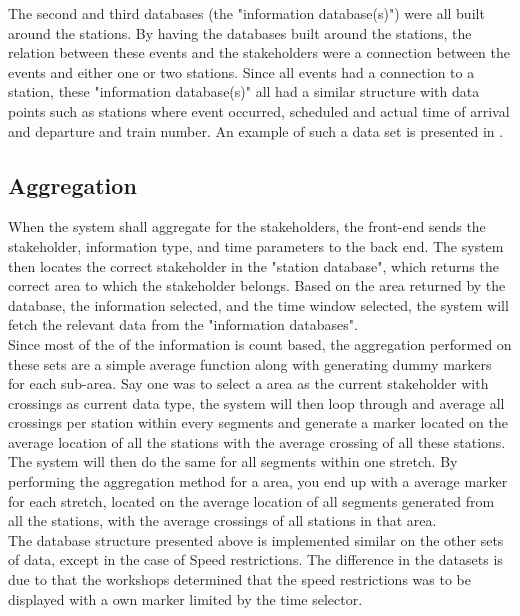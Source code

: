 The second and third databases (the "information database(s)") were all built
around the stations. By having the databases built around the stations, the 
relation between these events and the stakeholders were a connection between 
the events and either one or two stations. Since all events had a connection 
to a station, these "information database(s)" all had a similar structure with 
data points such as stations where event occurred, scheduled and actual time 
of arrival and departure and train number. An example of such a data set is 
presented in .


\subsection{Aggregation} %
\label{sub:back_end_aggregation}
When the system shall aggregate for the stakeholders, the front-end sends
the stakeholder, information type, and time parameters to the back end. 
The system then locates the correct stakeholder in the "station database",
which returns the correct area to which the stakeholder belongs. Based on the 
area returned by the database, the information selected, and the time window
selected, the system will fetch the relevant data from the "information 
databases". \\

Since most of the of the information is count based, the aggregation performed
on these sets are a simple average function along with generating dummy 
markers for each sub-area. Say one was to select a area as the current 
stakeholder with crossings as current data type, the system will then loop 
through and average all crossings per station within every segments and 
generate a marker located on the average location of all the stations with the 
average crossing of all these stations. The system will then do the same for 
all segments within one stretch. By performing the aggregation method for a 
area, you end up with a average marker for each stretch, located on the  
average location of all segments generated from all the stations, with the 
average crossings of all stations in that area.\\

The database structure presented above is implemented similar on the other 
sets of data, except in the case of Speed restrictions. The difference in the
datasets is due to that the workshops determined that the speed restrictions
was to be displayed with a own marker limited by the time selector.

